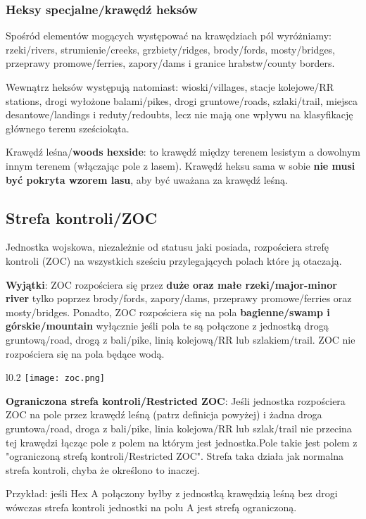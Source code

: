 \subsubsection*{Heksy specjalne/krawędź heksów}
Spośród elementów mogących występować na krawędziach pól wyróżniamy: rzeki/rivers, strumienie/creeks, grzbiety/ridges, brody/fords, mosty/bridges, przeprawy promowe/ferries, zapory/dams i granice hrabstw/county borders.\par
Wewnątrz heksów występują natomiast: wioski/villages, stacje kolejowe/RR stations, drogi wyłożone balami/pikes, drogi gruntowe/roads, szlaki/trail, miejsca desantowe/landings i reduty/redoubts, lecz nie mają one wpływu na klasyfikację głównego terenu sześciokąta.\par
Krawędź leśna/\textbf{woods hexside}: to krawędź między terenem lesistym a dowolnym innym terenem (włączając pole z lasem). Krawędź heksu sama w sobie \textbf{nie musi być pokryta wzorem lasu}, aby być uważana za krawędź leśną.

\subsection{Strefa kontroli/ZOC}
Jednostka wojskowa, niezależnie od statusu jaki posiada, rozpościera strefę kontroli (ZOC) na wszystkich sześciu przylegających polach które ją otaczają.\par
\textbf{Wyjątki}: ZOC rozpościera się przez \textbf{duże oraz małe rzeki/major-minor river} tylko poprzez brody/fords, zapory/dams, przeprawy promowe/ferries oraz mosty/bridges. Ponadto, ZOC rozpościera się na pola \textbf{bagienne/swamp i górskie/mountain} wyłącznie jeśli pola te są połączone z jednostką drogą gruntową/road, drogą z bali/pike, linią kolejową/RR lub szlakiem/trail. ZOC nie rozpościera się na pola będące wodą.
\begin{wrapfigure}{l}{0.2\textwidth}
  \texttt{[image: zoc.png]}
\end{wrapfigure}\par
\textbf{Ograniczona strefa kontroli/Restricted ZOC}: Jeśli jednostka rozpościera ZOC na pole przez krawędź leśną (patrz definicja powyżej) i żadna droga gruntowa/road, droga z bali/pike, linia kolejowa/RR lub szlak/trail nie przecina tej krawędzi łącząc pole z polem na którym jest jednostka.Pole takie jest polem z "ograniczoną strefą kontroli/Restricted ZOC". Strefa taka działa jak normalna strefa kontroli, chyba że określono to inaczej.\par
Przykład: jeśli Hex A połączony byłby z jednostką krawędzią leśną bez drogi wówczas strefa kontroli jednostki na polu A jest strefą ograniczoną.

